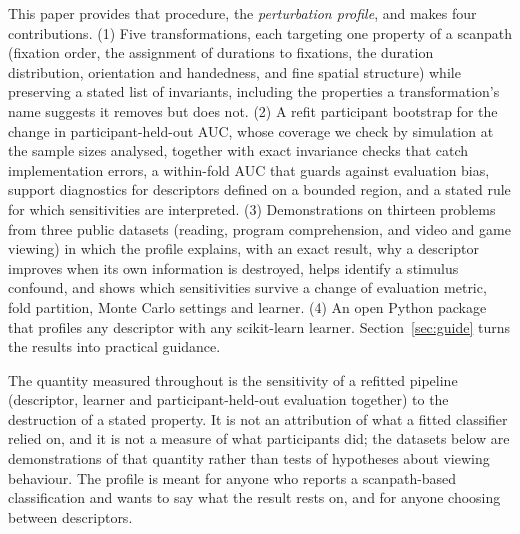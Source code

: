 This paper provides that procedure, the \emph{perturbation profile}, and makes four contributions. (1) Five transformations, each targeting one property of a scanpath (fixation order, the assignment of durations to fixations, the duration distribution, orientation and handedness, and fine spatial structure) while preserving a stated list of invariants, including the properties a transformation's name suggests it removes but does not. (2) A refit participant bootstrap for the change in participant-held-out AUC, whose coverage we check by simulation at the sample sizes analysed, together with exact invariance checks that catch implementation errors, a within-fold AUC that guards against evaluation bias, support diagnostics for descriptors defined on a bounded region, and a stated rule for which sensitivities are interpreted. (3) Demonstrations on thirteen problems from three public datasets (reading, program comprehension, and video and game viewing) in which the profile explains, with an exact result, why a descriptor improves when its own information is destroyed, helps identify a stimulus confound, and shows which sensitivities survive a change of evaluation metric, fold partition, Monte Carlo settings and learner. (4) An open Python package that profiles any descriptor with any scikit-learn learner. Section~\ref{sec:guide} turns the results into practical guidance.

The quantity measured throughout is the sensitivity of a refitted pipeline (descriptor, learner and participant-held-out evaluation together) to the destruction of a stated property. It is not an attribution of what a fitted classifier relied on, and it is not a measure of what participants did; the datasets below are demonstrations of that quantity rather than tests of hypotheses about viewing behaviour. The profile is meant for anyone who reports a scanpath-based classification and wants to say what the result rests on, and for anyone choosing between descriptors.
